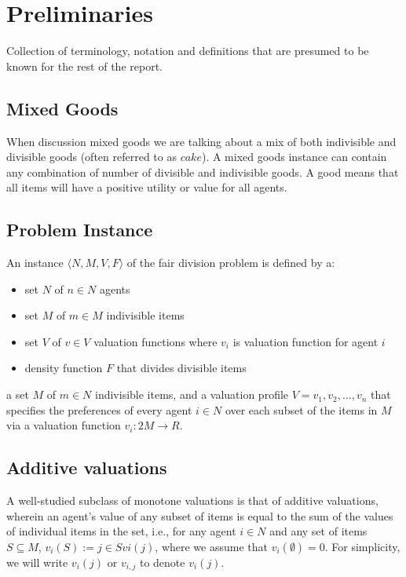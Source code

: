 \section{Preliminaries}\label{sec:preliminaries}

Collection of terminology, notation and definitions that are presumed to be known for the rest of the report.


\subsection*{Mixed Goods}
When discussion mixed goods we are talking about a mix of both indivisible and divisible goods (often referred to as $cake$). A mixed goods instance can contain any combination of number of divisible and indivisible goods. A good means that all items will have a positive utility or value for all agents.



\subsection*{Problem Instance}
An instance $\langle N, M, V, F \rangle$ of the fair division problem is defined by a:
\begin{itemize}
    \item set $N$ of $n \in N$ agents
    \item set $M$ of $m \in M$ indivisible items
    \item set $V$ of $v \in V$ valuation functions where $v_i$ is valuation function for agent $i$
    \item density function $F$ that divides divisible items
\end{itemize}
a set $M$ of $m \in N$ indivisible items, and a valuation profile $V = {v_1, v_2, . . . , v_n}$ that specifies the preferences of every agent $i \in N$ over each subset of the items in $M$ via a valuation function $v_i : 2M \rightarrow R$.



\subsection*{Additive valuations}
A well-studied subclass of monotone valuations is that of additive valuations, wherein an agent's value of any subset of items is equal to the sum of the values of individual items in the set, i.e., for any agent $i \in N$ and any set of items $S \subseteq M$, $v_i(S) := j \in S vi({j})$, where we assume that $v_i(\emptyset) = 0$. For simplicity, we will write $v_i(j)$ or $v_{i,j}$ to denote $v_i({j})$.



